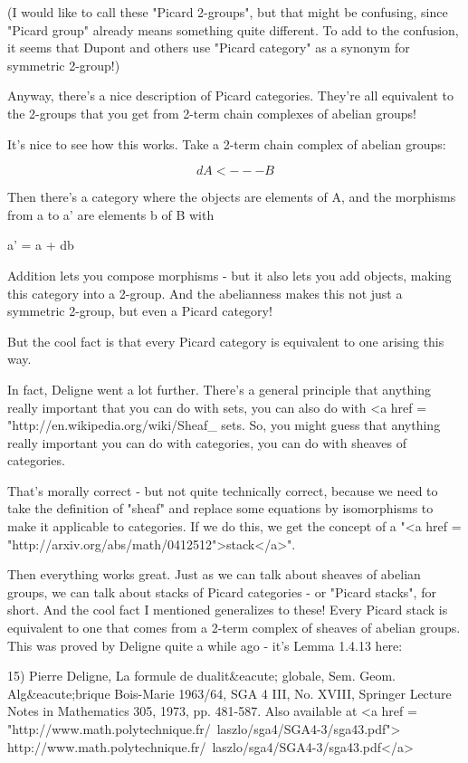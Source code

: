 (I would like to call these "Picard 2-groups", but that might be
confusing, since "Picard group" already means something quite
different.  To add to the confusion, it seems that Dupont and
others use "Picard category" as a synonym for symmetric 2-group!)

Anyway, there's a nice description of Picard categories.  They're all
equivalent to the 2-groups that you get from 2-term chain complexes of
abelian groups!

It's nice to see how this works.  Take a 2-term chain complex of
abelian groups:


$$

    d
A <--- B
$$
    

Then there's a category where the objects are elements of A, and 
the morphisms from a to a' are elements b of B with 

a' = a + db

Addition lets you compose morphisms - but it also lets you add
objects, making this category into a 2-group.  And the abelianness
makes this not just a symmetric 2-group, but even a Picard category!

But the cool fact is that every Picard category is equivalent to 
one arising this way.  

In fact, Deligne went a lot further.  There's a general principle that
anything really important that you can do with sets, you can also do
with <a href =
"http://en.wikipedia.org/wiki/Sheaf_%
sets.  So, you might guess that anything really important you can do
with categories, you can do with sheaves of categories.

That's morally correct - but not quite technically correct, because we
need to take the definition of "sheaf" and replace some
equations by isomorphisms to make it applicable to categories.  If we
do this, we get the concept of a "<a href =
"http://arxiv.org/abs/math/0412512">stack</a>".

Then everything works great.  Just as we can talk about sheaves of
abelian groups, we can talk about stacks of Picard categories - or
"Picard stacks", for short.  And the cool fact I mentioned
generalizes to these!  Every Picard stack is equivalent to one that
comes from a 2-term complex of sheaves of abelian groups.  This was
proved by Deligne quite a while ago - it's Lemma 1.4.13 here:

15) Pierre Deligne, La formule de dualit&eacute; globale,
Sem. Geom. Alg&eacute;brique Bois-Marie 1963/64, SGA 4 III, No. XVIII, 
Springer Lecture Notes in Mathematics 305, 1973, pp. 481-587.
Also available at
<a href = "http://www.math.polytechnique.fr/~laszlo/sga4/SGA4-3/sga43.pdf">
http://www.math.polytechnique.fr/~laszlo/sga4/SGA4-3/sga43.pdf</a>

